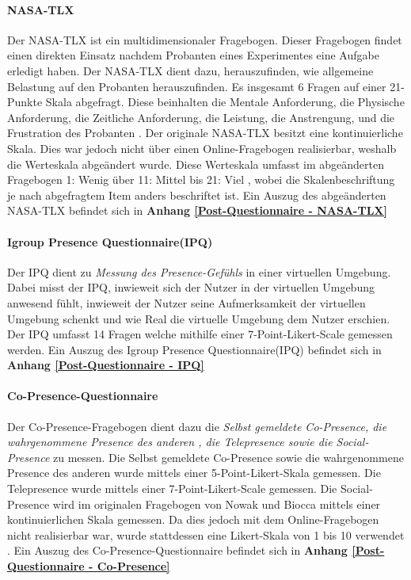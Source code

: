 \documentclass[a4paper,11pt]{article}%
\renewcommand{\\}{\vspace*{0.5\baselineskip} \newline}
\begin{document}
		\paragraph{NASA-TLX}
Der NASA-TLX ist ein multidimensionaler Fragebogen. Dieser Fragebogen findet einen direkten Einsatz nachdem Probanten eines Experimentes eine Aufgabe erledigt haben. Der NASA-TLX dient dazu, herauszufinden, wie allgemeine Belastung auf den Probanten herauszufinden.
Es insgesamt 6 Fragen auf einer 21-Punkte Skala abgefragt. Diese beinhalten die Mentale Anforderung, die Physische Anforderung, die Zeitliche Anforderung, die Leistung, die Anstrengung, und die Frustration des Probanten \cite{NASATLX}.
Der originale NASA-TLX besitzt eine kontinuierliche Skala. Dies war jedoch nicht über einen Online-Fragebogen realisierbar, weshalb die Werteskala abgeändert wurde. Diese Werteskala umfasst im abgeänderten Fragebogen \dq{}1: Wenig \dq{} über \dq{}11: Mittel \dq{} bis \dq{}21: Viel \dq{}, wobei die Skalenbeschriftung je nach abgefragtem Item anders beschriftet ist.
Ein Auszug des abgeänderten NASA-TLX befindet sich in \textbf{Anhang \ref{Post-Questionnaire - NASA-TLX}}


		\paragraph{Igroup Presence Questionnaire(IPQ)}
Der IPQ dient zu  \textit{Messung des Presence-Gefühls} in einer virtuellen Umgebung. Dabei misst der IPQ, inwieweit sich der Nutzer in der virtuellen Umgebung anwesend fühlt, inwieweit der Nutzer seine Aufmerksamkeit der virtuellen Umgebung schenkt und wie Real die virtuelle Umgebung dem Nutzer erschien. Der IPQ umfasst 14 Fragen welche mithilfe einer 7-Point-Likert-Scale gemessen werden.
\\Ein Auszug des Igroup Presence Questionnaire(IPQ) befindet sich in \textbf{Anhang \ref{Post-Questionnaire - IPQ}}
		
		\paragraph{Co-Presence-Questionnaire}
Der Co-Presence-Fragebogen dient dazu die  \textit{Selbst gemeldete Co-Presence, die wahrgenommene Presence des \dq{}anderen \dq{}, die Telepresence sowie die Social-Presence} zu messen. Die Selbst gemeldete Co-Presence sowie die wahrgenommene Presence des \dq{}anderen \dq{} wurde mittels einer 5-Point-Likert-Skala gemessen. Die Telepresence wurde mittels einer 7-Point-Likert-Scale gemessen. Die Social-Presence wird im originalen Fragebogen von Nowak und Biocca mittels einer kontinuierlichen Skala gemessen. Da dies jedoch mit dem Online-Fragebogen nicht realisierbar war, wurde stattdessen eine Likert-Skala von 1 bis 10 verwendet \citep[p.487]{nowak2004effect}.
Ein Auszug des Co-Presence-Questionnaire befindet sich in \textbf{Anhang \ref{Post-Questionnaire - Co-Presence}}
\end{document}
